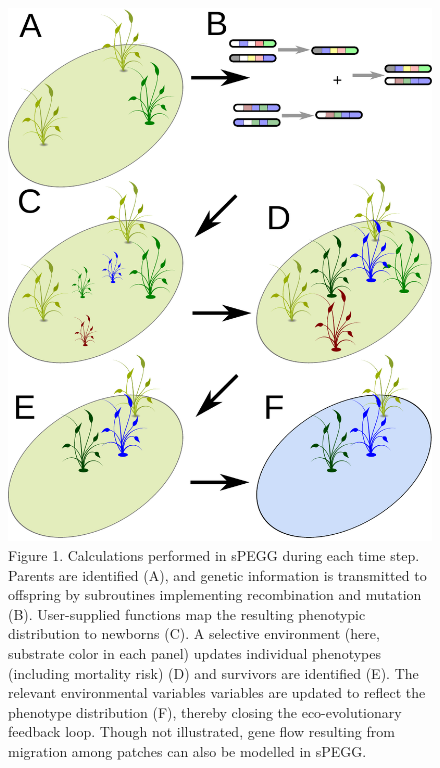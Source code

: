 \documentclass[1p,numbered]{article}
\begin{document}
\begin{linenumbers}
\newpage
\begin{figure}[h!]
   \centering
   \includegraphics[width=0.6\linewidth] {MainTextFigures/Fig1.pdf}
\caption*{Figure 1. Calculations performed in sPEGG during each time step. Parents are identified (A), and genetic information is transmitted to offspring by subroutines implementing recombination and mutation (B). User-supplied functions map the resulting phenotypic distribution to newborns (C). A selective environment (here, substrate color in each panel) updates individual phenotypes (including mortality risk) (D) and survivors are identified (E). The relevant environmental variables variables are updated to reflect the phenotype distribution (F), thereby closing the eco-evolutionary feedback loop. Though not illustrated, gene flow resulting from migration among patches can also be modelled in sPEGG.}
\end{figure}


\end{linenumbers}
\end{document}
